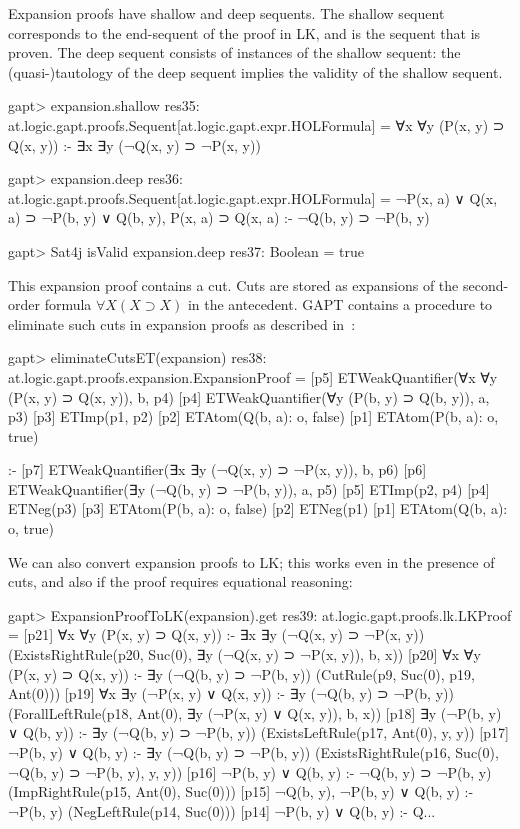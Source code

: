 \documentclass[a4paper,11pt]{article}
\newcommand{\impl}{\supset} %
\begin{document}
Expansion proofs have shallow and deep sequents.  The shallow sequent
corresponds to the end-sequent of the proof in LK, and is the sequent that is
proven.  The deep sequent consists of instances of the shallow sequent: the
(quasi-)tautology of the deep sequent implies the validity of the shallow
sequent.
\begin{clilisting}
gapt> expansion.shallow
res35: at.logic.gapt.proofs.Sequent[at.logic.gapt.expr.HOLFormula] = ∀x ∀y (P(x, y) ⊃ Q(x, y)) :- ∃x ∃y (¬Q(x, y) ⊃ ¬P(x, y))

gapt> expansion.deep
res36: at.logic.gapt.proofs.Sequent[at.logic.gapt.expr.HOLFormula] =
¬P(x, a) ∨ Q(x, a) ⊃ ¬P(b, y) ∨ Q(b, y),
P(x, a) ⊃ Q(x, a)
:-
¬Q(b, y) ⊃ ¬P(b, y)

gapt> Sat4j isValid expansion.deep
res37: Boolean = true

\end{clilisting}

This expansion proof contains a cut.  Cuts are stored as expansions of the
second-order formula $\forall X (X \impl X)$ in the antecedent.  GAPT contains
a procedure to eliminate such cuts in expansion proofs as described
in~\cite{Hetzl2013Expansion}:
\begin{clilisting}
gapt> eliminateCutsET(expansion)
res38: at.logic.gapt.proofs.expansion.ExpansionProof =
[p5] ETWeakQuantifier(∀x ∀y (P(x, y) ⊃ Q(x, y)), b, p4)
[p4] ETWeakQuantifier(∀y (P(b, y) ⊃ Q(b, y)), a, p3)
[p3] ETImp(p1, p2)
[p2] ETAtom(Q(b, a): o, false)
[p1] ETAtom(P(b, a): o, true)

:-
[p7] ETWeakQuantifier(∃x ∃y (¬Q(x, y) ⊃ ¬P(x, y)), b, p6)
[p6] ETWeakQuantifier(∃y (¬Q(b, y) ⊃ ¬P(b, y)), a, p5)
[p5] ETImp(p2, p4)
[p4] ETNeg(p3)
[p3] ETAtom(P(b, a): o, false)
[p2] ETNeg(p1)
[p1] ETAtom(Q(b, a): o, true)

\end{clilisting}

We can also convert expansion proofs to LK; this works even in the presence of
cuts, and also if the proof requires equational reasoning:
\begin{clilisting}
gapt> ExpansionProofToLK(expansion).get
res39: at.logic.gapt.proofs.lk.LKProof =
[p21] ∀x ∀y (P(x, y) ⊃ Q(x, y)) :- ∃x ∃y (¬Q(x, y) ⊃ ¬P(x, y))    (ExistsRightRule(p20, Suc(0), ∃y (¬Q(x, y) ⊃ ¬P(x, y)), b, x))
[p20] ∀x ∀y (P(x, y) ⊃ Q(x, y)) :- ∃y (¬Q(b, y) ⊃ ¬P(b, y))    (CutRule(p9, Suc(0), p19, Ant(0)))
[p19] ∀x ∃y (¬P(x, y) ∨ Q(x, y)) :- ∃y (¬Q(b, y) ⊃ ¬P(b, y))    (ForallLeftRule(p18, Ant(0), ∃y (¬P(x, y) ∨ Q(x, y)), b, x))
[p18] ∃y (¬P(b, y) ∨ Q(b, y)) :- ∃y (¬Q(b, y) ⊃ ¬P(b, y))    (ExistsLeftRule(p17, Ant(0), y, y))
[p17] ¬P(b, y) ∨ Q(b, y) :- ∃y (¬Q(b, y) ⊃ ¬P(b, y))    (ExistsRightRule(p16, Suc(0), ¬Q(b, y) ⊃ ¬P(b, y), y, y))
[p16] ¬P(b, y) ∨ Q(b, y) :- ¬Q(b, y) ⊃ ¬P(b, y)    (ImpRightRule(p15, Ant(0), Suc(0)))
[p15] ¬Q(b, y), ¬P(b, y) ∨ Q(b, y) :- ¬P(b, y)    (NegLeftRule(p14, Suc(0)))
[p14] ¬P(b, y) ∨ Q(b, y) :- Q...
\end{clilisting}
\end{document}
